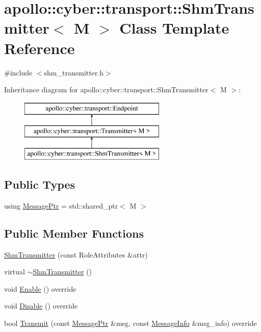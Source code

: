 \hypertarget{classapollo_1_1cyber_1_1transport_1_1ShmTransmitter}{\section{apollo\-:\-:cyber\-:\-:transport\-:\-:Shm\-Transmitter$<$ M $>$ Class Template Reference}
\label{classapollo_1_1cyber_1_1transport_1_1ShmTransmitter}
}


{\ttfamily \#include $<$shm\-\_\-transmitter.\-h$>$}

Inheritance diagram for apollo\-:\-:cyber\-:\-:transport\-:\-:Shm\-Transmitter$<$ M $>$\-:\begin{figure}[H]
\begin{center}
\leavevmode
\includegraphics[height=3.000000cm]{classapollo_1_1cyber_1_1transport_1_1ShmTransmitter}
\end{center}
\end{figure}
\subsection*{Public Types}
\begin{DoxyCompactItemize}
\item 
using \hyperlink{classapollo_1_1cyber_1_1transport_1_1ShmTransmitter_a2970b67f207ebf3359f3b2b5e0407287}{Message\-Ptr} = std\-::shared\-\_\-ptr$<$ M $>$
\end{DoxyCompactItemize}
\subsection*{Public Member Functions}
\begin{DoxyCompactItemize}
\item 
\hyperlink{classapollo_1_1cyber_1_1transport_1_1ShmTransmitter_a3c29627d7c09996c4997230196343304}{Shm\-Transmitter} (const Role\-Attributes \&attr)
\item 
virtual \hyperlink{classapollo_1_1cyber_1_1transport_1_1ShmTransmitter_a44c390334213e749cb8628f3d1c61ac3}{$\sim$\-Shm\-Transmitter} ()
\item 
void \hyperlink{classapollo_1_1cyber_1_1transport_1_1ShmTransmitter_ae47bc5dc313f901843600ca23ae51926}{Enable} () override
\item 
void \hyperlink{classapollo_1_1cyber_1_1transport_1_1ShmTransmitter_a5f4559decbf0802768bcf7f9a083e202}{Disable} () override
\item 
bool \hyperlink{classapollo_1_1cyber_1_1transport_1_1ShmTransmitter_aed9d36fd9aba98640a4acfbcbe2610fb}{Transmit} (const \hyperlink{classapollo_1_1cyber_1_1transport_1_1ShmTransmitter_a2970b67f207ebf3359f3b2b5e0407287}{Message\-Ptr} \&msg, const \hyperlink{classapollo_1_1cyber_1_1transport_1_1MessageInfo}{Message\-Info} \&msg\-\_\-info) override
\end{DoxyCompactItemize}
